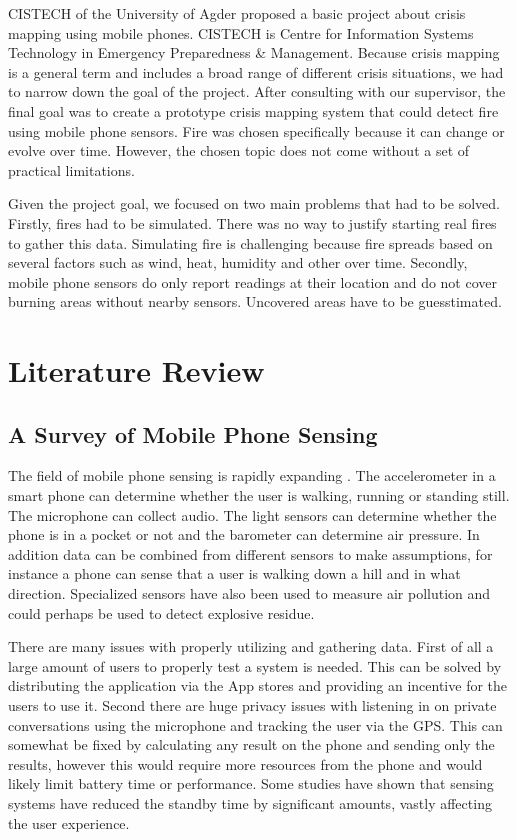 CISTECH of the University of Agder proposed a basic project about crisis mapping using mobile phones. CISTECH is  Centre for Information Systems Technology in Emergency Preparedness \& Management. Because crisis mapping is a general term and includes a broad range of different crisis situations, we had to narrow down the goal of the project. After consulting with our supervisor, the final goal was to create a prototype crisis mapping system that could detect fire using mobile phone sensors. Fire was chosen specifically because it can change or evolve over time. However, the chosen topic does not come without a set of practical limitations.

Given the project goal, we focused on two main problems that had to be solved. Firstly, fires had to be simulated. There was no way to justify starting real fires to gather this data. Simulating fire is challenging because fire spreads based on several factors such as wind, heat, humidity and other over time. Secondly, mobile phone sensors do only report readings at their location and do not cover burning areas without nearby sensors. Uncovered areas have to be guesstimated.

\section{Literature Review}

\subsection{A Survey of Mobile Phone Sensing}

The field of mobile phone sensing is rapidly expanding \cite{mobsurv}. The accelerometer in a smart phone can determine whether the user is walking, running or standing still. The microphone can collect audio. The light sensors can determine whether the phone is in a pocket or not and the barometer can determine air pressure. In addition data can be combined from different sensors to make assumptions, for instance a phone can sense that a user is walking down a hill and in what direction. Specialized sensors have also been used to measure air pollution and could perhaps be used to detect explosive residue.

There are many issues with properly utilizing and gathering data. First of all a large amount of users to properly test a system is needed. This can be solved by distributing the application via the App stores and providing an incentive for the users to use it. Second there are huge privacy issues with listening in on private conversations using the microphone and tracking the user via the GPS. This can somewhat be fixed by calculating any result on the phone and sending only the results, however this would require more resources from the phone and would likely limit battery time or performance. Some studies have shown that sensing systems have reduced the standby time by significant amounts, vastly affecting the user experience.

